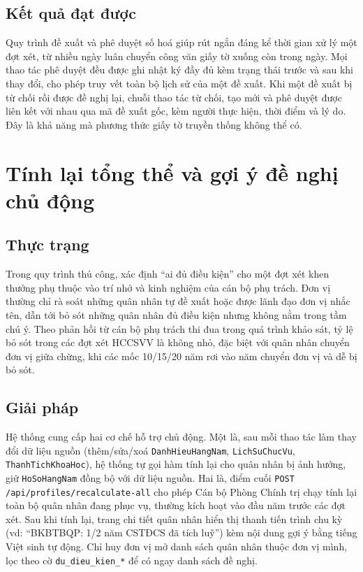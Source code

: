 \documentclass[../DoAn.tex]{subfiles}
\begin{document}
\subsection*{Kết quả đạt được}
Quy trình đề xuất và phê duyệt số hoá giúp rút ngắn đáng kể thời gian xử lý một đợt xét, từ nhiều ngày luân chuyển công văn giấy tờ xuống còn trong ngày. Mọi thao tác phê duyệt đều được ghi nhật ký đầy đủ kèm trạng thái trước và sau khi thay đổi, cho phép truy vết toàn bộ lịch sử của một đề xuất. Khi một đề xuất bị từ chối rồi được đề nghị lại, chuỗi thao tác từ chối, tạo mới và phê duyệt được liên kết với nhau qua mã đề xuất gốc, kèm người thực hiện, thời điểm và lý do. Đây là khả năng mà phương thức giấy tờ truyền thống không thể có.

\section{Tính lại tổng thể và gợi ý đề nghị chủ động}
\label{section:5.3}

\subsection*{Thực trạng}
Trong quy trình thủ công, xác định ``ai đủ điều kiện'' cho một đợt xét khen thưởng phụ thuộc vào trí nhớ và kinh nghiệm của cán bộ phụ trách. Đơn vị thường chỉ rà soát những quân nhân tự đề xuất hoặc được lãnh đạo đơn vị nhắc tên, dẫn tới bỏ sót những quân nhân đủ điều kiện nhưng không nằm trong tầm chú ý. Theo phản hồi từ cán bộ phụ trách thi đua trong quá trình khảo sát, tỷ lệ bỏ sót trong các đợt xét HCCSVV là không nhỏ, đặc biệt với quân nhân chuyển đơn vị giữa chừng, khi các mốc 10/15/20 năm rơi vào năm chuyển đơn vị và dễ bị bỏ sót.

\subsection*{Giải pháp}
Hệ thống cung cấp hai cơ chế hỗ trợ chủ động. Một là, sau mỗi thao tác làm thay đổi dữ liệu nguồn (thêm/sửa/xoá \texttt{DanhHieuHangNam}, \texttt{LichSuChucVu}, \texttt{ThanhTichKhoaHoc}), hệ thống tự gọi hàm tính lại cho quân nhân bị ảnh hưởng, giữ \texttt{HoSoHangNam} đồng bộ với dữ liệu nguồn. Hai là, điểm cuối \texttt{POST /api/profiles/recalculate-all} cho phép Cán bộ Phòng Chính trị chạy tính lại toàn bộ quân nhân đang phục vụ, thường kích hoạt vào đầu năm trước các đợt xét. Sau khi tính lại, trang chi tiết quân nhân hiển thị thanh tiến trình chu kỳ (vd: ``BKBTBQP: 1/2 năm CSTĐCS đã tích luỹ'') kèm nội dung gợi ý bằng tiếng Việt sinh tự động. Chỉ huy đơn vị mở danh sách quân nhân thuộc đơn vị mình, lọc theo cờ \texttt{du\_dieu\_kien\_*} để có ngay danh sách đề nghị.
\end{document}

